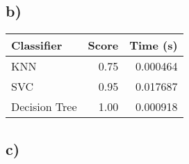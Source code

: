 \documentclass{article}
\begin{document}
          \subsection{b)}
            \begin{tabular}{lrr}
              \toprule
              Classifier &  Score &  Time (s) \\
              \midrule
              KNN           &   0.75 &  0.000464 \\
              SVC           &   0.95 &  0.017687 \\
              Decision Tree &   1.00 &  0.000918 \\
              \bottomrule
            \end{tabular}
          \subsection{c)}
\end{document}

